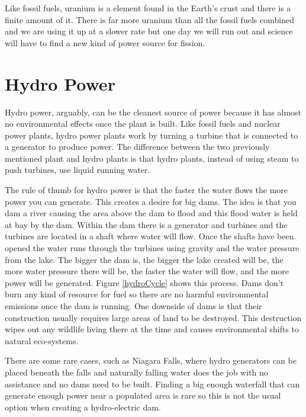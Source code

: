 \documentclass[msc,oneside]{ubcthesis}%
\begin{document}
Like fossil fuels, uranium is a element found in the Earth's crust and there is a finite amount of it. There is far more uranium than all the fossil fuels combined and we are using it up at a slower rate but one day we will run out and science will have to find a new kind of power source for fission. 

\newpage
\section{Hydro Power}

Hydro power, arguably, can be the cleanest source of power because it has almost no 
environmental effects once the plant is built. Like fossil fuels and nuclear power plants, hydro power 
plants work by turning a turbine that is connected to a generator to produce power. The difference between the two previously mentioned plant and hydro plants is that hydro plants, instead of using 
steam to push turbines, use liquid running water.

The rule of thumb for hydro power is that the faster the water flows the more power you can generate. This 
creates a desire for big dams. The idea is that you dam a river causing the area above the dam 
to flood and this flood water is held at bay by the dam. Within the dam there is a generator and turbines and the turbines are located in a shaft where water will flow. Once the shafts have been opened the water runs through the turbines using gravity and the water pressure from the lake. The bigger the dam is, the bigger the lake created will be, the more water pressure there will be, the faster the water will flow, and the more power will be generated. 
Figure \ref{hydroCycle} shows this process. Dams don't burn any kind of resource for fuel so there are no harmful environmental emissions once the dam is running. One downside of dams is that their construction usually requires large areas of land to be destroyed. This destruction wipes out any wildlife living there at the time and causes environmental shifts to natural eco-systems. 

There are some rare cases, such as Niagara Falls, where hydro generators can be placed beneath the falls and naturally falling water does the job with no assistance and no dams need to be built. Finding a big enough waterfall that can generate enough power near a populated area is rare so this is not the usual option when creating a hydro-electric dam. 
\end{document}
